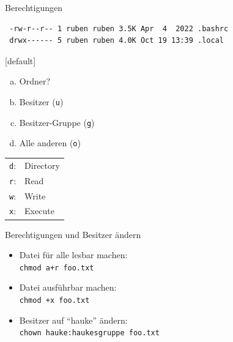 \documentclass[compress]{beamer}
\begin{document}
\begin{frame}[fragile]{Berechtigungen}
    \vspace{-8mm}

\Huge
\begin{verbatim}
 -rw-r--r-- 1 ruben ruben 3.5K Apr  4  2022 .bashrc
 drwx------ 5 ruben ruben 4.0K Oct 19 13:39 .local
\end{verbatim}

\normalsize

\hspace*{3mm}

{
    [default]
    \begin{enumerate}[a)]
        \item Ordner?
        \item Besitzer (\texttt{u})
        \item Besitzer-Gruppe (\texttt{g})
        \item Alle anderen (\texttt{o})
    \end{enumerate}
}

\vspace{-20mm}
\hspace*{65mm}
\begin{tabular}{|ll|}
\hline
\verb+d+:& Directory \\
\verb+r+:& Read \\
\verb+w+:& Write \\
\verb+x+:& Execute \\
\hline
\end{tabular}

\end{frame}

\begin{frame}[fragile]{Berechtigungen und Besitzer ändern}
\begin{itemize}
\item Datei für alle lesbar machen:\\
\verb|chmod a+r foo.txt|
\item Datei ausführbar machen:\\
\verb|chmod +x foo.txt|
\item Besitzer auf \enquote{hauke} ändern:\\
\verb+chown hauke:haukesgruppe foo.txt+
\end{itemize}
\end{frame}
\end{document}
